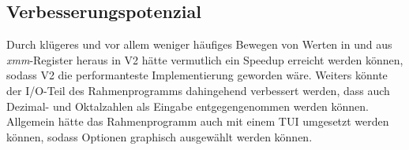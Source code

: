 \documentclass[course=erap]{aspdoc}
\begin{document}
\subsection{Verbesserungspotenzial}
Durch klügeres und vor allem weniger häufiges Bewegen von Werten in und aus \emph{xmm}-Register heraus
in V2 hätte vermutlich ein Speedup erreicht werden können, sodass V2 die performanteste Implementierung
geworden wäre.
Weiters könnte der I/O-Teil des Rahmenprogramms dahingehend verbessert werden, dass auch Dezimal- und
Oktalzahlen als Eingabe entgegengenommen werden können. Allgemein hätte das Rahmenprogramm auch mit einem 
TUI umgesetzt werden können, sodass Optionen graphisch ausgewählt werden können.




{}
\end{document}

